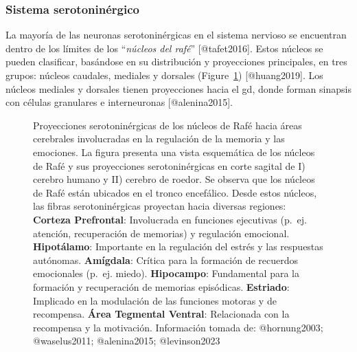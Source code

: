 \documentclass[
  11pt]{../MastersDoctoralThesisUNAM}
\begin{document}
\subsubsection{Sistema
serotoninérgico}\label{sistema-serotoninuxe9rgico}

La mayoría de las neuronas serotoninérgicas en el sistema nervioso se
encuentran dentro de los límites de los ``\emph{núcleos del rafé}''
{[}@tafet2016{]}. Estos núcleos se pueden clasificar, basándose en su
distribución y proyecciones principales, en tres grupos: núcleos
caudales, mediales y dorsales (Figure~\ref{fig-raphe}) {[}@huang2019{]}.
Los núcleos mediales y dorsales tienen proyecciones hacia el \ac{gd},
donde forman sinapsis con células granulares e interneuronas
{[}@alenina2015{]}.

\begin{figure}


\caption[Proyecciones serotoninérgicas de los núcleos de
Rafé]{\label{fig-raphe}Proyecciones serotoninérgicas de los núcleos de
Rafé hacia áreas cerebrales involucradas en la regulación de la memoria
y las emociones. La figura presenta una vista esquemática de los núcleos
de Rafé y sus proyecciones serotoninérgicas en corte sagital de I)
cerebro humano y II) cerebro de roedor. Se observa que los núcleos de
Rafé están ubicados en el tronco encefálico. Desde estos núcleos, las
fibras serotoninérgicas proyectan hacia diversas regiones:
\textbf{Corteza Prefrontal}: Involucrada en funciones ejecutivas (p.~ej.
atención, recuperación de memorias) y regulación emocional.
\textbf{Hipotálamo}: Importante en la regulación del estrés y las
respuestas autónomas. \textbf{Amígdala}: Crítica para la formación de
recuerdos emocionales (p.~ej. miedo). \textbf{Hipocampo}: Fundamental
para la formación y recuperación de memorias episódicas.
\textbf{Estriado}: Implicado en la modulación de las funciones motoras y
de recompensa. \textbf{Área Tegmental Ventral}: Relacionada con la
recompensa y la motivación. Información tomada de: @hornung2003;
@waselus2011; @alenina2015; @levinson2023}

\end{figure}%
\end{document}
